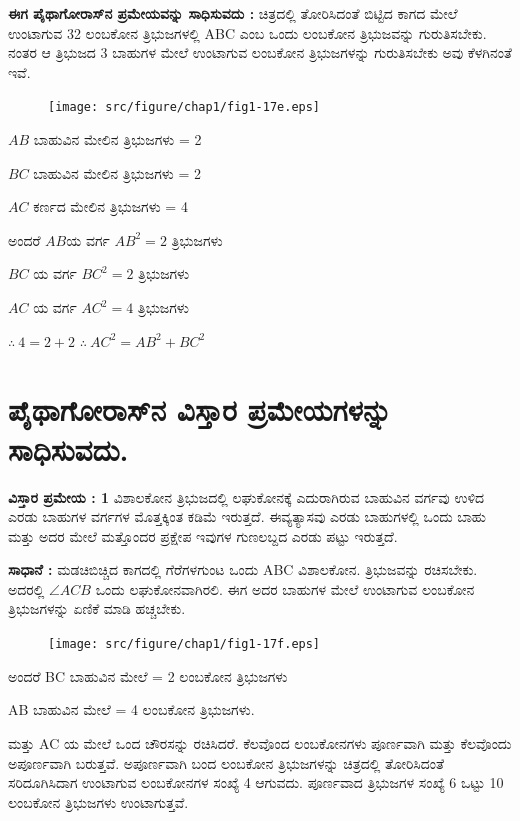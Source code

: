 \medskip

\noindent
\textbf{ಈಗ ಪೈಥಾಗೋರಾಸ್‌ನ ಪ್ರಮೇಯವನ್ನು ಸಾಧಿಸುವದು :} ಚಿತ್ರದಲ್ಲಿ ತೋರಿಸಿದಂತೆ ಬಿಟ್ಟಿದ ಕಾಗದ ಮೇಲೆ ಉಂಟಾಗುವ 32 ಲಂಬಕೋನ ತ್ರಿಭುಜಗಳಲ್ಲಿ ABC ಎಂಬ ಒಂದು ಲಂಬಕೋನ ತ್ರಿಭುಜವನ್ನು ಗುರುತಿಸಬೇಕು. ನಂತರ ಆ ತ್ರಿಭುಜದ 3 ಬಾಹುಗಳ ಮೇಲೆ ಉಂಟಾಗುವ ಲಂಬಕೋನ ತ್ರಿಭುಜಗಳನ್ನು ಗುರುತಿಸಬೇಕು ಅವು ಕೆಳಗಿನಂತೆ ಇವೆ. 
\begin{figure}[H]
\centering
\texttt{[image: src/figure/chap1/fig1-17e.eps]}
\end{figure} 

$AB$ ಬಾಹುವಿನ ಮೇಲಿನ ತ್ರಿಭುಜಗಳು = 2 

\smallskip

$BC$ ಬಾಹುವಿನ ಮೇಲಿನ ತ್ರಿಭುಜಗಳು  = 2

\smallskip

$AC$ ಕರ್ಣದ ಮೇಲಿನ ತ್ರಿಭುಜಗಳು = 4
\smallskip

ಅಂದರೆ  $AB$ಯ ವರ್ಗ $AB^2 =2 $ ತ್ರಿಭುಜಗಳು 

\smallskip
$BC$ ಯ ವರ್ಗ $BC^2 = 2 $  ತ್ರಿಭುಜಗಳು

\smallskip
$AC$ ಯ ವರ್ಗ $AC^2 = 4$  ತ್ರಿಭುಜಗಳು

\smallskip
$\therefore ~ 4 = 2+2$ \quad $\therefore ~ AC^2 = AB^2 + BC^2$


\section*{ಪೈಥಾಗೋರಾಸ್‌ನ ವಿಸ್ತಾರ ಪ್ರಮೇಯಗಳನ್ನು ಸಾಧಿಸುವದು.}

\noindent
\textbf{ವಿಸ್ತಾರ ಪ್ರಮೇಯ : 1} ವಿಶಾಲಕೋನ ತ್ರಿಭುಜದಲ್ಲಿ ಲಘುಕೋನಕ್ಕೆ ಎದುರಾಗಿರುವ ಬಾಹುವಿನ ವರ್ಗವು ಉಳಿದ ಎರಡು ಬಾಹುಗಳ ವರ್ಗಗಳ ಮೊತ್ತಕ್ಕಿಂತ ಕಡಿಮೆ ಇರುತ್ತದೆ. ಈ\break ವ್ಯತ್ಯಾಸವು ಎರಡು ಬಾಹುಗಳಲ್ಲಿ ಒಂದು ಬಾಹು ಮತ್ತು ಅದರ ಮೇಲೆ ಮತ್ತೊಂದರ ಪ್ರಕ್ಷೇಪ ಇವುಗಳ ಗುಣಲಬ್ದದ ಎರಡು ಪಟ್ಟು ಇರುತ್ತದೆ. 

\noindent
\textbf{ಸಾಧಾನೆ :} ಮಡಚಿಬಿಚ್ಚಿದ ಕಾಗದಲ್ಲಿ ಗೆರೆಗಳಗುಂಟ ಒಂದು ABC ವಿಶಾಲಕೋನ. ತ್ರಿಭುಜವನ್ನು ರಚಿಸಬೇಕು. ಅದರಲ್ಲಿ $\angle ACB$ ಒಂದು ಲಘುಕೋನವಾಗಿರಲಿ. ಈಗ ಅದರ ಬಾಹುಗಳ ಮೇಲೆ ಉಂಟಾಗುವ ಲಂಬಕೋನ ತ್ರಿಭುಜಗಳನ್ನು ಏಣಿಕೆ ಮಾಡಿ ಹಚ್ಚಬೇಕು. 
\begin{figure}[H]
\centering
\texttt{[image: src/figure/chap1/fig1-17f.eps]}
\end{figure} 

ಅಂದರೆ BC ಬಾಹುವಿನ ಮೇಲೆ = 2 ಲಂಬಕೋನ  ತ್ರಿಭುಜಗಳು 

AB ಬಾಹುವಿನ ಮೇಲೆ = 4 ಲಂಬಕೋನ ತ್ರಿಭುಜಗಳು. 

ಮತ್ತು AC ಯ ಮೇಲೆ ಒಂದ ಚೌರಸನ್ನು ರಚಿಸಿದರೆ. ಕೆಲವೊಂದ ಲಂಬಕೋನಗಳು ಪೂರ್ಣವಾಗಿ ಮತ್ತು ಕೆಲವೊಂದು ಅಪೂರ್ಣವಾಗಿ ಬರುತ್ತವೆ. ಅಪೂರ್ಣವಾಗಿ ಬಂದ ಲಂಬಕೋನ ತ್ರಿಭುಜಗಳನ್ನು ಚಿತ್ರದಲ್ಲಿ ತೋರಿಸಿದಂತೆ ಸರಿದೂಗಿಸಿದಾಗ ಉಂಟಾಗುವ ಲಂಬಕೋನಗಳ ಸಂಖ್ಯೆ  4 ಆಗುವದು.  ಪೂರ್ಣವಾದ ತ್ರಿಭುಜಗಳ ಸಂಖ್ಯೆ  6 ಒಟ್ಟು 10 ಲಂಬಕೋನ ತ್ರಿಭುಜಗಳು ಉಂಟಾಗುತ್ತವೆ. 

